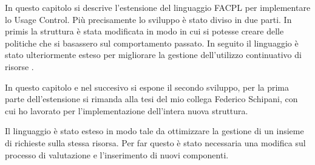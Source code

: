 \label{chap:Usage Control in FACPL}
In questo capitolo si descrive l'estensione del linguaggio FACPL per implementare lo Usage Control.
Più precisamente lo sviluppo è stato diviso in due parti. In primis la struttura è stata modificata in modo
in cui si potesse creare delle politiche che si basassero sul comportamento passato. In seguito il linguaggio
è stato ulteriormente esteso per migliorare la gestione dell'utilizzo continuativo di risorse .\par
In questo capitolo e nel succesivo si espone il secondo sviluppo, per la prima parte dell'estensione si rimanda
alla tesi del mio collega Federico Schipani, con cui ho lavorato per l'implementazione dell'intera nuova struttura.\\ \par
Il linguaggio è stato esteso in modo tale da ottimizzare la gestione di un insieme di richieste sulla stessa risorsa.
Per far questo è stato necessaria una modifica sul processo di valutazione e l'inserimento di nuovi componenti.
